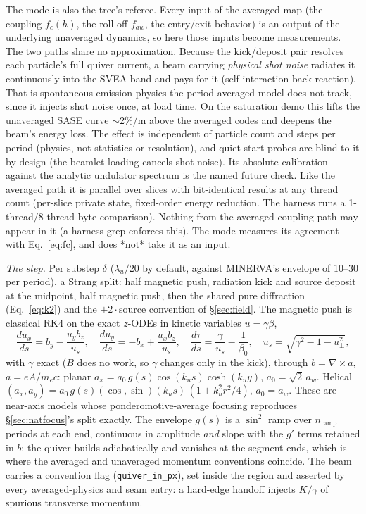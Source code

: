 \documentclass[11pt]{article}
\newcommand{\code}[1]{\texttt{#1}}
\begin{document}
The mode is also the tree's referee. Every input of the averaged map (the coupling
$f_c(h)$, the roll-off $f_{aw}$, the entry/exit behavior) is an output of the
underlying unaveraged dynamics, so here those inputs become measurements. The two
paths share no approximation. Because the kick/deposit pair resolves each particle's full quiver
current, a beam carrying \emph{physical shot noise} radiates it continuously into the
SVEA band and pays for it (self-interaction back-reaction). That is spontaneous-emission
physics the period-averaged model does not track, since it injects shot noise once, at
load time. On the saturation demo this lifts the unaveraged SASE curve $\sim$2\%/m above
the averaged codes and deepens the beam's energy loss. The effect is independent of
particle count and steps per period (physics, not statistics or resolution), and
quiet-start probes are blind to it by design (the beamlet loading cancels shot noise).
Its absolute calibration against the analytic undulator spectrum is the named future
check. Like the averaged path it is parallel over slices with
bit-identical results at any thread count (per-slice private state, fixed-order
energy reduction. The harness runs a 1-thread/8-thread byte comparison). Nothing
from the averaged coupling path may
appear in it (a harness grep enforces this). The mode measures its agreement with
Eq.~\ref{eq:fc}, and does *not* take it as an input.

\emph{The step.} Per substep $\delta$ ($\lambda_u/20$ by default, against MINERVA's
envelope of 10--30 per period), a Strang split: half magnetic push, radiation kick and source
deposit at the midpoint, half magnetic push, then the shared pure diffraction
(Eq.~\ref{eq:k2}) and the $+2\cdot$source convention of \S\ref{sec:field}. The
magnetic push is classical RK4 on the exact $z$-ODEs in kinetic variables
$u = \gamma\beta$,
\begin{equation}\label{eq:unavgode}
  \frac{du_x}{ds} = b_y - \frac{u_y b_z}{u_s},\quad
  \frac{du_y}{ds} = -b_x + \frac{u_x b_z}{u_s},\quad
  \frac{d\tau}{ds} = \frac{\gamma}{u_s} - \frac{1}{\beta_0},\quad
  u_s = \sqrt{\gamma^2 - 1 - u_\perp^2},
\end{equation}
with $\gamma$ exact ($B$ does no work, so $\gamma$ changes only in the kick), through
$b = \nabla\times a$, $a = eA/m_ec$:
planar $a_x = a_0\, g(s) \cos(k_u s)\cosh(k_u y)$, $a_0 = \sqrt2\,a_w$. Helical
$(a_x, a_y) = a_0\, g(s)(\cos, \sin)(k_u s)\,(1 + k_u^2 r^2/4)$, $a_0 = a_w$. These
are near-axis models whose ponderomotive-average focusing reproduces
\S\ref{sec:natfocus}'s split exactly. The envelope $g(s)$ is a $\sin^2$ ramp over
$n_{\mathrm{ramp}}$ periods at each end, continuous in amplitude \emph{and} slope
with the $g'$ terms retained in $b$: the quiver builds adiabatically and vanishes at
the segment ends, which is where the averaged and unaveraged momentum conventions
coincide. The beam carries a convention flag (\code{quiver\_in\_px}), set inside the
region and asserted by every averaged-physics and seam entry: a hard-edge handoff
injects $K/\gamma$ of spurious transverse momentum.
\end{document}
